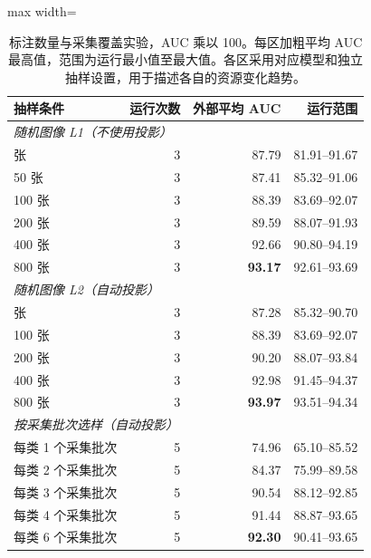 \begin{table}[htbp]
\centering\small
\caption{标注数量与采集覆盖实验，AUC 乘以 100。每区加粗平均 AUC 最高值，范围为运行最小值至最大值。各区采用对应模型和独立抽样设置，用于描述各自的资源变化趋势。}
\label{tab:coverage}
\begin{adjustbox}{max width=\linewidth}
\begin{tabular}{lrrr}
\toprule
抽样条件 & 运行次数 & 外部平均 AUC & 运行范围\\
\midrule
\multicolumn{4}{l}{\textit{随机图像 L1（不使用投影）}}\\
\addlinespace[2pt]
25 张 & 3 & 87.79 & 81.91--91.67\\
50 张 & 3 & 87.41 & 85.32--91.06\\
100 张 & 3 & 88.39 & 83.69--92.07\\
200 张 & 3 & 89.59 & 88.07--91.93\\
400 张 & 3 & 92.66 & 90.80--94.19\\
800 张 & 3 & \textbf{93.17} & 92.61--93.69\\
\midrule
\multicolumn{4}{l}{\textit{随机图像 L2（自动投影）}}\\
\addlinespace[2pt]
50 张 & 3 & 87.28 & 85.32--90.70\\
100 张 & 3 & 88.39 & 83.69--92.07\\
200 张 & 3 & 90.20 & 88.07--93.84\\
400 张 & 3 & 92.98 & 91.45--94.37\\
800 张 & 3 & \textbf{93.97} & 93.51--94.34\\
\midrule
\multicolumn{4}{l}{\textit{按采集批次选样（自动投影）}}\\
\addlinespace[2pt]
每类 1 个采集批次 & 5 & 74.96 & 65.10--85.52\\
每类 2 个采集批次 & 5 & 84.37 & 75.99--89.58\\
每类 3 个采集批次 & 5 & 90.54 & 88.12--92.85\\
每类 4 个采集批次 & 5 & 91.44 & 88.87--93.65\\
每类 6 个采集批次 & 5 & \textbf{92.30} & 90.41--93.65\\
\bottomrule
\end{tabular}
\end{adjustbox}
\end{table}
